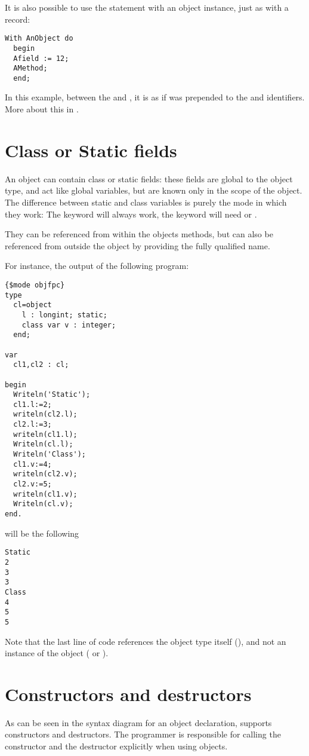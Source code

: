 It is also possible to use the  statement with an object instance,
just as with a record:
\begin{verbatim}
With AnObject do
  begin
  Afield := 12;
  AMethod;
  end;
\end{verbatim}
In this example, between the  and , it is as if
 was prepended to the  and 
identifiers. More about this in .

\section{Class or Static fields}
An object can contain class or static fields: these fields are global to the object type,
and act like global variables, but are known only in the scope of the object.
The difference between static and class variables is purely the mode in which they work:
The  keyword will always work, the  keyword will need   or .

They can be referenced from within the objects methods, but can also be referenced from
outside the object by providing the fully qualified name.

For instance, the output of the following program:
\begin{verbatim}
{$mode objfpc}
type
  cl=object
    l : longint; static;
    class var v : integer;
  end;

var
  cl1,cl2 : cl;

begin
  Writeln('Static');
  cl1.l:=2;
  writeln(cl2.l);
  cl2.l:=3;
  writeln(cl1.l);
  Writeln(cl.l);
  Writeln('Class');
  cl1.v:=4;
  writeln(cl2.v);
  cl2.v:=5;
  writeln(cl1.v);
  Writeln(cl.v);
end.
\end{verbatim}
will be the following
\begin{verbatim}
Static
2
3
3
Class
4
5
5
\end{verbatim}
Note that the last line of code references the object type itself (),
and not an instance of the object ( or ).


\section{Constructors and destructors }
 
\label{se:constructdestruct}
As can be seen in the syntax diagram for an object declaration, \fpc supports
constructors and destructors. The programmer is responsible for calling the
constructor and the destructor explicitly when using objects.

